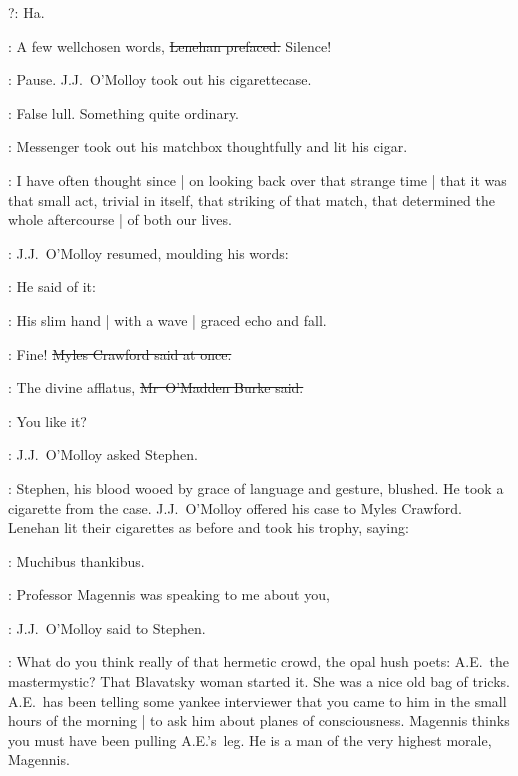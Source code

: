 \crawford?:
Ha.

\lenehan:
A few wellchosen words,
\sout{Lenehan prefaced.}
Silence!

:
Pause.
J.J.~O'Molloy took out his cigarettecase.

\StephenInt:
False lull.
Something quite ordinary.

\StephenInt:
Messenger took out his matchbox thoughtfully and lit his cigar.

\StephenInt:
I have often thought since |
on looking back over that strange time |
that it was that small act,
trivial in itself,
that striking of that match,
that determined the whole aftercourse |
of both our lives.



:
J.J.~O'Molloy resumed,
moulding his words:

\jjom:
He said of it:
\stage{[as Bushe]}

:
His slim hand |
with a wave |
graced echo and fall.

\crawford:
Fine!
\sout{Myles Crawford said at once.}

\omaddenburke:
The divine afflatus,
\sout{Mr~O'Madden Burke said.}

\jjom:
You like it?

:
J.J.~O'Molloy asked Stephen.

:
Stephen,
his blood wooed by grace of language and gesture,
blushed.
He took a cigarette from the case.
J.J.~O'Molloy offered his case to Myles Crawford.
Lenehan lit their cigarettes as before
and took his trophy,
saying:

\lenehan:
Muchibus thankibus.



\jjom:
Professor Magennis was speaking to me about you,

:
J.J.~O'Molloy said to Stephen.

\jjom:
What do you think really of that hermetic crowd,
the opal hush poets:
A.E.~the mastermystic?
That Blavatsky woman started it.
She was a nice old bag of tricks.
A.E.~has been telling some yankee interviewer
that you came to him in the small hours of the morning |
to ask him about planes of consciousness.
Magennis thinks you must have been pulling A.E.'s~leg.
He is a man of the very highest morale,
Magennis.

